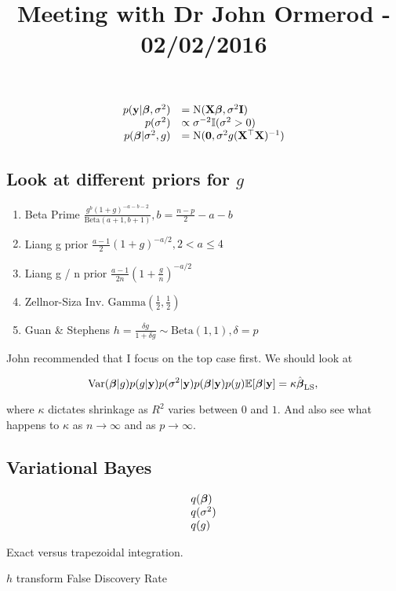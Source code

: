 \documentclass{amsart}
\title{Meeting with Dr John Ormerod - 02/02/2016}
\begin{document}
\maketitle

\def \N {\text{N}}
\def \I {\mathbb{I}}
\def \Beta {\text{Beta}}
\def \IG {\text{Inv. Gamma}}
\[
\begin{array}{rl}
	p(\vy | \vbeta, \sigma^2) &= \N(\mX \vbeta, \sigma^2 \mI) \\
	p(\sigma^2) &\propto \sigma^{-2} \I(\sigma^2 > 0) \\
	p(\vbeta | \sigma^2, g) &= \N(\vzero, \sigma^2 g (\mX^\top \mX)^{-1})
\end{array}
\]

\subsection{Look at different priors for $g$}

\begin{enumerate}
	\item Beta Prime $\frac{g^b (1 + g)^{-a-b-2}}{\Beta(a + 1, b + 1)}, b = \frac{n - p}{2} - a - b$
	\item Liang g prior $\frac{a - 1}{2} (1 + g)^{-a/2}, 2 < a \leq 4$
	\item Liang g / n prior $\frac{a - 1}{2n} (1 + \frac{g}{n})^{-a/2}$
	\item Zellnor-Siza $\IG(\frac{1}{2}, \frac{1}{2})$
	\item Guan \& Stephens $h = \frac{\delta g}{1 + \delta g} \sim \Beta(1, 1), \delta = p$
\end{enumerate}

John recommended that I focus on the top case first. We should look at

\[
	\text{Var}({\boldsymbol \beta} | g) \\
	p(g | {\bf y}) \\
	p(\sigma^2 | {\bf y}) \\
	p({\boldsymbol \beta} | {\bf y}) \\
	p(y) \\
	{\mathbb E} [{\boldsymbol \beta} | {\bf y}] = \kappa \hat{{\boldsymbol \beta}}_{\text{LS}}, \\
\]

where $\kappa$ dictates shrinkage as $R^2$ varies between $0$ and $1$.
And also see what happens to $\kappa$ as $n \to \infty$ and as $p \to \infty$.

\subsection{Variational Bayes}

\[
\begin{array}{l}
	q({\boldsymbol \beta}) \\
	q(\sigma^2) \\
	q(g) \\
\end{array}
\]

Exact versus trapezoidal integration.

$h$ transform
False Discovery Rate
\end{document}
